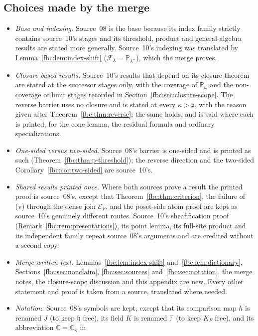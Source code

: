 \documentclass[11pt,letterpaper]{article}
\theoremstyle{definition}
\theoremstyle{remark}
\newcommand{\om}{\omega}
\newcommand{\C}{\mathbb C}
\newcommand{\PP}{\mathbb P}
\newcommand{\cp}{\mathfrak p}
\newcommand{\ch}{\mathfrak h}
\newcommand{\cE}{\mathcal E}
\newcommand{\Fd}{\mathbb F}
\begin{document}
\subsection{Choices made by the merge}
\begin{itemize}
\item \emph{Base and indexing.} Source~08 is the base because its index
family strictly contains source~10's stages and its threshold, product
and general-algebra results are stated more generally. Source~10's
indexing was translated by Lemma~\ref{fbc:lem:index-shift}
($\mathcal F_\lambda=\PP_{\lambda^+}$), which the merge proves.
\item \emph{Closure-based results.} Source~10's results that depend on its
closure theorem are stated at the successor stages only, with the
coverage of $\PP_\om$ and the non-coverage of limit stages recorded in
Section~\ref{fbc:sec:closure-scope}. The reverse barrier uses no closure
and is stated at every $\kappa>\cp$, with the reason given after
Theorem~\ref{fbc:thm:reverse}; the same holds, and is said where each is
printed, for the cone lemma, the residual formula and ordinary
specializations.
\item \emph{One-sided versus two-sided.} Source~08's barrier is one-sided
and is printed as such (Theorem~\ref{fbc:thm:p-threshold}); the reverse
direction and the two-sided Corollary~\ref{fbc:cor:two-sided} are
source~10's.
\item \emph{Shared results printed once.} Where both sources prove a
result the printed proof is source~08's, except that
Theorem~\ref{fbc:thm:criterion}, the failure of (v) through the dense
join $\cE_F$, and the poset-side atom proof are kept as source~10's
genuinely different routes. Source~10's sheafification proof
(Remark~\ref{fbc:rem:presentations}), its point lemma, its full-site
product and its independent family repeat source~08's arguments and are
credited without a second copy.
\item \emph{Merge-written text.} Lemmas~\ref{fbc:lem:index-shift}
and~\ref{fbc:lem:dictionary}, Sections~\ref{fbc:sec:nonclaim},
\ref{fbc:sec:sources} and~\ref{fbc:sec:notation}, the merge notes, the
closure-scope discussion and this appendix are new. Every other
statement and proof is taken from a source, translated where needed.
\item \emph{Notation.} Source~08's symbols are kept, except that its
comparison map $h$ is renamed $J$ (to keep $\ch$ free), its field $K$ is
renamed $\Fd$ (to keep $K_F$ free), and its abbreviation $\C=\C_\kappa$ in

\end{itemize}
\end{document}
